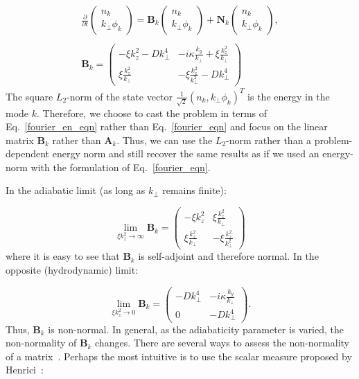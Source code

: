 \documentclass[twocolumn,showkeys,superscriptaddress]{revtex4}
\def\beq{\begin{equation}}
\def\eeq{\end{equation}}
\def\beqar{\begin{eqnarray}}
\def\eeqar{\end{eqnarray}}
\begin{document}
\beqar
\label{fourier_en_eqn}
\frac{\partial}{\partial t} \left( \begin{array}{cc} n_k \\ k_\perp \phi_k \end{array} \right) = \mathbf{B}_k \left( \begin{array}{cc} n_k \\ k_\perp \phi_k \end{array} \right) + \mathbf{N}_k \left( \begin{array}{cc} n_k \\ k_\perp \phi_k \end{array} \right), \\ \nonumber \\
\label{B_k}
\mathbf{B}_k = \left( \begin{array}{cc} -\xi k_z^2 - D k_\perp^4 & -i \kappa \frac{k_y}{k_\perp} + \xi \frac{k_z^2}{k_\perp} \\  \xi \frac{k_z^2}{k_\perp} & - \xi \frac{k_z^2}{k_\perp^2} - D k_\perp^4\end{array} \right)
\eeqar
The square $L_2$-norm of the state vector $\frac{1}{\sqrt{2}} \left( n_k , k_\perp \phi_k \right)^T$ is the energy in the mode $k$.
Therefore, we choose to cast the problem in terms of Eq.~\ref{fourier_en_eqn} rather than Eq.~\ref{fourier_eqn} and focus on the linear matrix $\mathbf{B}_k$ rather than $\mathbf{A}_k$. Thus, we can use
the $L_2$-norm rather than a problem-dependent energy norm and still recover the same results as if we used an energy-norm with the formulation of Eq.~\ref{fourier_eqn}.

In the adiabatic limit (as long as $k_\perp$ remains finite):

\beq
\label{B_norm_limit}
\displaystyle\lim_{\xi k_z^2 \to \infty} \mathbf{B}_k = \left( \begin{array}{cc} -\xi k_z^2 & \xi \frac{k_z^2}{k_\perp} \\  \xi \frac{k_z^2}{k_\perp} & - \xi \frac{k_z^2}{k_\perp^2} \end{array} \right)
\eeq
where it is easy to see that $\mathbf{B}_k$ is self-adjoint and therefore normal. In the opposite (hydrodynamic) limit:

\beq
\label{B_norm_limit0}
\displaystyle\lim_{\xi k_z^2 \to 0} \mathbf{B}_k = \left( \begin{array}{cc} - D k_\perp^4 & -i \kappa \frac{k_y}{k_\perp} \\ 0  & - D k_\perp^4\end{array} \right).
\eeq
Thus, $\mathbf{B}_k$ is non-normal. In general, as the adiabaticity parameter is varied, the non-normality of $\mathbf{B}_k$ changes. There are several ways to assess the non-normality of a matrix~\cite{trefethen2005}.
Perhaps the most intuitive is to use the scalar measure proposed by Henrici~\cite{henrici1962}:
\end{document}

